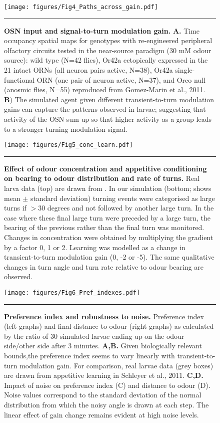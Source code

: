 \documentclass[10pt,a4paper]{article}
\begin{document}
\begin{figure}[!ht]
\begin{center}
\texttt{[image: figures/Fig4\_Paths\_across\_gain.pdf]}
\caption{{\bf OSN input and signal-to-turn modulation gain.}
{\bf A.} Time occupancy spatial maps for genotypes with re-engineered peripheral olfactory circuits tested in the near-source paradigm (30 mM odour source): wild type (N=42 flies), Or42a ectopically expressed in the 21 intact ORNs (all neuron pairs active, N=38), Or42a single-functional ORN (one pair of neuron active, N=37), and Orco null (anosmic flies, N=55) reproduced from Gomez-Marin et al., 2011.
{\bf B}) The simulated agent given different transient-to-turn modulation gains can capture the patterns observed in larvae; suggesting that activity of the OSN sum up so that higher activity as a group leads to a stronger turning modulation signal.
\label{fig:Fig4}}
\hrule
\end{center}
\end{figure}


\begin{figure}[!ht]
\begin{center}
\texttt{[image: figures/Fig5\_conc\_learn.pdf]}
\caption{{\bf Effect of odour concentration and appetitive conditioning on bearing to odour distribution and rate of turns.} Real larva data (top) are drawn from \citep{schleyer2015learning}. In our simulation (bottom; shows mean $\pm$ standard deviation) turning events were categorised as large turns if $>30$ degrees and not followed by another large turn. In the case where these final large turn were preceded by a large turn, the bearing of the previous rather than the final turn was monitored. Changes in concentration were obtained by multiplying the gradient by a factor 0, 1 or 2. Learning was modelled as a change in transient-to-turn modulation gain (0, -2 or -5). The same qualitative changes in turn angle and turn rate relative to odour bearing are observed.
\label{fig:Fig5}}
\hrule
\end{center}
\end{figure}

\begin{figure}[!ht]
\begin{center}
\texttt{[image: figures/Fig6\_Pref\_indexes.pdf]}
\caption{{\bf Preference index and robustness to noise. }
Preference index (left graphs) and final distance to odour (right graphs) as calculated by the ratio of 30 simulated larvae ending up on the odour side/other side after 3 minutes.
{\bf A,B.} Given biologically relevant bounds,the preference index seems to vary linearly with transient-to-turn modulation gain. For comparison, real larvae data (grey boxes) are drawn from appetitive learning in Schleyer et al., 2011.
{\bf C,D.} Impact of noise on preference index (C) and distance to odour (D). Noise values correspond to the standard deviation of the normal distribution from which the noisy angle is drawn at each step. The linear effect of gain change remains evident at high noise levels.
\label{fig:Fig6}}
\hrule
\end{center}
\end{figure}
\end{document}
